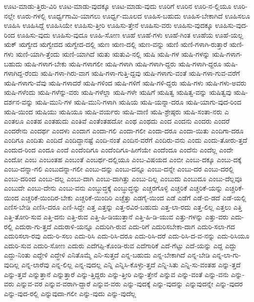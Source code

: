 {ಊಟ-ಮಾಡು-ತ್ತಿರು-ವಿರಿ
ಊಟ-ಮಾಡು-ವುದಕ್ಕೂ
ಊಟ-ಮಾಡು-ವುದು
ಊರಿಗೆ
ಊರಿನ
ಊರಿ-ನ-ಲ್ಲಿಯೂ
ಊರಿ-ನಲ್ಲೇ
ಊರು-ಗಳಲ್ಲಿ
ಊರ್ಧ್ವಗಾಮಿ-ಯಾಗಲು
ಊರ್ಧ್ವ-ಮೂಲದ
ಊಹಿಸ-ಬಹುದು
ಊಹಿಸ-ಬೇಕಾಗಿದೆ
ಊಹಿಸಲೂ
ಊಹಿಸಿ
ಊಹಿಸಿದ್ದೆ
ಊಹಿಸಿಯೇ
ಊಹಿಸು-ತ್ತೀರಿ
ಊಹಿಸು-ತ್ತೇನೆ
ಊಹಿಸು-ವರು
ಊಹಿಸು-ವುದಕ್ಕೂ
ಊಹಿಸು-ವುದ-ರಿಂದ
ಊಹಿಸು-ವುದು
ಊಹಿಸು-ವುದೂ
ಊಹಿ-ಸೋಣ
ಊಹೆ
ಊಹೆ-ಗಳು
ಊಹೆ-ಗಿಂತ
ಊಹೆಯ
ಊಹೆ-ಯಲ್ಲ
ಋಕ್
ಋಗ್ವೇದ
ಋಗ್ವೇದದ
ಋಗ್ವೇದ-ದಲ್ಲಿ
ಋಣ
ಋಣ-ದಲ್ಲಿ
ಋಣ-ವನ್ನು
ಋಣಿ
ಋಣಿ-ಗಳಾಗಿ-ರುತ್ತಾರೆ
ಋಣಿ-ಗಳು
ಋಣಿ-ಯಾಗಿ-ತ್ತೆಂದು
ಋಣಿ-ಯಾಗಿದೆ
ಋತು
ಋತುವಿ-ನಲ್ಲಿ
ಋಷಿ
ಋಷಿ-ಗಳ
ಋಷಿ-ಗಳನ್ನು
ಋಷಿ-ಗಳಾಗ-ಬಹುದು
ಋಷಿ-ಗಳಾಗ-ಬೇಕು
ಋಷಿ-ಗಳಾಗಲೀ
ಋಷಿ-ಗಳಾಗಿ
ಋಷಿ-ಗಳಾಗಿ-ದ್ದರು
ಋಷಿ-ಗಳಾಗಿ-ದ್ದರೂ
ಋಷಿ-ಗಳಾಗಿದ್ದ-ರೆಂದು
ಋಷಿ-ಗಳಾ-ಗಿರು-ವಾಗ
ಋಷಿ-ಗಳಾ-ಗುತ್ತಿ-ದ್ದವು
ಋಷಿ-ಗಳಾಗು-ವಂತೆ
ಋಷಿ-ಗಳಾ-ಗುವ-ವರೆಗೆ
ಋಷಿ-ಗಳಾಗು-ವೆವು
ಋಷಿ-ಗಳಾದರೆ
ಋಷಿ-ಗಳಿಂದ
ಋಷಿ-ಗಳಿಗೆ
ಋಷಿ-ಗಳಿ-ದ್ದರು
ಋಷಿ-ಗಳು
ಋಷಿ-ಗಳು-ಅವರು
ಋಷಿ-ಗಳೆಂದು
ಋಷಿ-ಗಳೆನ್ನು-ವರು
ಋಷಿ-ಗಳೆಲ್ಲಾ
ಋಷಿ-ಗಳೇ
ಋಷಿಗೆ
ಋಷಿತ್ವ
ಋಷಿತ್ವ-ವನ್ನು
ಋಷಿತ್ವವು
ಋಷಿ-ದರ್ಶನ-ವನ್ನು
ಋಷಿ-ಮುನಿ-ಗಳ
ಋಷಿ-ಮುನಿ-ಗಳಾಗಿ
ಋಷಿಯ
ಋಷಿ-ಯನ್ನಾ-ದರೂ
ಋಷಿ-ಯಾಗು-ವುದ-ರಿಂದ
ಋಷಿ-ಯಿಂದ
ಋಷಿಯು
ಋಷಿಯೂ
ಋಷಿ-ವರ್ಯರು
ಋಷಿ-ವಾಣಿ
ಋಷಿ-ಶ್ರೇಷ್ಠರು
ಋಷಿ-ಸಂತಾ-ನರು
ಎ
ಎಂತಲೂ
ಎಂತಹ
ಎಂತಹುದು
ಎಂತಿವೆ
ಎಂತೆಂತಹದೋ
ಎಂಥ
ಎಂಥದು
ಎಂದ
ಎಂದನು
ಎಂದರು
ಎಂದರೆ
ಎಂದರೇನು
ಎಂದರ್ಥ
ಎಂದಳು
ಎಂದಾಗ
ಎಂದಾ-ಗಲಿ
ಎಂದಾ-ಗಲೀ
ಎಂದಾ-ದರೂ
ಎಂದಾ-ಯಿತು
ಎಂದಿಗಾ-ದರೂ
ಎಂದಿಗೂ
ಎಂದಿತು
ಎಂದಿದೆ
ಎಂದಿದ್ದಾನಷ್ಟೆ
ಎಂದಿ-ನಂತೆ
ಎಂದಿನ-ವರೆಗೆ
ಎಂದಿರು-ವನು
ಎಂದು
ಎಂದು-ತೋರು-ತ್ತದೆ
ಎಂದುದ-ರಿಂದ
ಎಂದೂ
ಎಂದೆ
ಎಂದೆಂದಿಗೂ
ಎಂದೆಂದಿಗೂ-ಹೀಗೆಯೇ
ಎಂದೆಂದೂ
ಎಂದೆನು
ಎಂದೆಲ್ಲ
ಎಂದೇ
ಎಂದೋ
ಎಂಬ
ಎಂಬಂತಹ
ಎಂಬಂತೆ
ಎಂಬರ್ಥ-ದಲ್ಲಿಯೂ
ಎಂಬ-ವಿಷಯದ
ಎಂಬೀ
ಎಂಬು-ದಕ್ಕೂ
ಎಂಬು-ದಕ್ಕೆ
ಎಂಬು-ದನ್ನಾ-ಗಲಿ
ಎಂಬುದನ್ನಾ-ಗಲೀ
ಎಂಬು-ದನ್ನು
ಎಂಬು-ದನ್ನೂ
ಎಂಬು-ದನ್ನೇ
ಎಂಬು-ದರ
ಎಂಬು-ದರಲ್ಲಿ
ಎಂಬು-ದರಿಂದ
ಎಂಬು-ದಲ್ಲ
ಎಂಬು-ದಾಗಿ
ಎಂಬು-ದಾಗಿತ್ತು
ಎಂಬು-ದಿಲ್ಲ
ಎಂಬುದು
ಎಂಬುದೂ
ಎಂಬು-ದೆಲ್ಲವೂ
ಎಂಬುದೇ
ಎಂಬು-ದೇನು
ಎಂಬು-ವನು
ಎಂಬ್ಧುದ್ಧಕ್ಕೆ
ಎಂಬ್ಧುದ್ಧನ್ನು
ಎಚ್ಚರಗೊಳ್ಳಿ
ಎಚ್ಚರಿಕೆ
ಎಚ್ಚರಿಕೆ-ಯನ್ನು
ಎಚ್ಚರಿಕೆ-ಯಿಂದ
ಎಚ್ಚರಿಕೆ-ಯಿಂದಿರ-ಬೇಕು
ಎಚ್ಚರಿಕೆ-ಯಿಂದಿರಿ
ಎಚ್ಚೆತ್ತು
ಎಡಗೈ-ಯಿಂದ
ಎಡೆ
ಎಡೆಗೆ
ಎಡೆ-ಬಿ-ಡದೆ
ಎಡೆ-ಯಲ್ಲಿ
ಎಣಿಸ-ಬೇಡಿ
ಎಣಿಸಿ-ದರೂ
ಎಣಿ-ಸಿದ್ದೇ
ಎತ್ತ
ಎತ್ತನ್ನು
ಎತ್ತ-ರವಿರ-ಬಹುದು
ಎತ್ತ-ಲಾ-ರದು
ಎತ್ತ-ಲಿಲ್ಲ
ಎತ್ತಲು
ಎತ್ತಿ
ಎತ್ತಿ-ತೋರಿ-ಸುವ
ಎತ್ತಿ-ದನು
ಎತ್ತಿ-ರುವ
ಎತ್ತಿ-ಹಿ-ಡಿಯುತ್ತಾನೆ
ಎತ್ತಿ-ಹಿ-ಡಿ-ಯುವ
ಎತ್ತು-ಗಳನ್ನು
ಎತ್ತು-ವರು
ಎದು-ರಲ್ಲಿ
ಎದುರಾ-ಗು-ತ್ತದೆ
ಎದುರಾಳಿ-ಯನ್ನೂ
ಎದುರಿಗಿ-ರುವ
ಎದು-ರಿಗೆ
ಎದುರಿಸಬೇಕಾ-ದಾಗ
ಎದುರಿ-ಸಲಾ-ಗದ
ಎದುರಿಸಲಾ-ರವು
ಎದು-ರಿ-ಸಲು
ಎದು-ರಿಸಿ
ಎದು-ರಿಸಿ-ದರೂ
ಎದು-ರಿಸಿ-ದರೆ
ಎದು-ರಿಸಿ-ದ-ವ-ನನ್ನು
ಎದು-ರಿಸಿಯೂ
ಎದುರಿ-ಸುವ
ಎದುರಿ-ಸೋಣ
ಎದುರು
ಎದೆಗಪ್ಪಿ-ಕೊಂಡಿ-ರುವ
ಎದೆಗಾರಿಕೆ
ಎದೆ-ಗೆಟ್ಟು
ಎದೆ-ಯನ್ನು
ಎದ್ದ
ಎದ್ದು
ಎದ್ದು-ನಿಂತು
ಎದ್ದೇಳಿ
ಎದ್ಧೇಳಿ
ಎನಿತೊಮ್ಮೆ
ಎನಿ-ಸುತ್ತದೆ
ಎನ್ನ-ಬಹುದು
ಎನ್ನ-ಬೇಕಾಗಿದೆ
ಎನ್ನ-ಬೇಡಿ
ಎನ್ನ-ಲಾ-ಗು-ವುದಿಲ್ಲ
ಎನ್ನ-ಲಾರೆವು
ಎನ್ನ-ಲಿಲ್ಲ
ಎನ್ನ-ವುದಲ್ಲ
ಎನ್ನಿ
ಎನ್ನಿಸಿ-ಕೊಳ್ಳು-ತ್ತದೆ
ಎನ್ನಿ-ಸಿತು
ಎನ್ನಿ-ಸು-ವಂತಹ
ಎನ್ನು-ತ್ತದೆ
ಎನ್ನು-ತ್ತವೆ
ಎನ್ನುತ್ತಾನೆ
ಎನ್ನುತ್ತಾರೆ
ಎನ್ನು-ತ್ತಿದ್ದರು
ಎನ್ನು-ತ್ತೀರಿ
ಎನ್ನು-ತ್ತೇನೆ
ಎನ್ನುವ
ಎನ್ನು-ವಂತೆ
ಎನ್ನು-ವನು
ಎನ್ನು-ವರು
ಎನ್ನುವ-ವರ
ಎನ್ನುವ-ವರಾಗಿ-ದ್ದಾರೆ
ಎನ್ನುವ-ವರು
ಎನ್ನು-ವುದಕ್ಕೆ
ಎನ್ನು-ವುದನ್ನು
ಎನ್ನುವುದನ್ನೇ
ಎನ್ನು-ವುದರ
ಎನ್ನು-ವುದ-ರಲ್ಲಿ
ಎನ್ನುವುದಾ-ಗಲೀ
ಎನ್ನು-ವುದು
ಎನ್ನು-ವುದೆಲ್ಲ
}
